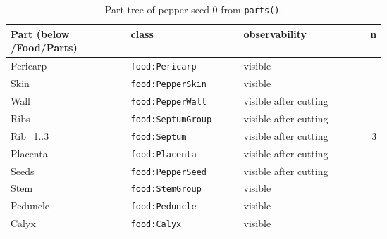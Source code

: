 \documentclass[10.5pt,a4paper]{article}
\begin{document}
\begin{table}[htbp]\centering\scriptsize\caption{Part tree of pepper seed 0 from \texttt{parts()}.}
\begin{tabularx}{\linewidth}{@{}p{0.32\linewidth}p{0.3\linewidth}Xr@{}}\toprule Part (below /Food/Parts) & class & observability & n \\\midrule
\hspace*{0.0em}Pericarp & \texttt{food:Pericarp} & visible &  \\
\hspace*{0.9em}Skin & \texttt{food:PepperSkin} & visible &  \\
\hspace*{0.9em}Wall & \texttt{food:PepperWall} & visible after cutting &  \\
\hspace*{0.0em}Ribs & \texttt{food:SeptumGroup} & visible after cutting &  \\
\hspace*{0.9em}Rib\_1..3 & \texttt{food:Septum} & visible after cutting & 3 \\
\hspace*{0.0em}Placenta & \texttt{food:Placenta} & visible after cutting &  \\
\hspace*{0.0em}Seeds & \texttt{food:PepperSeed} & visible after cutting &  \\
\hspace*{0.0em}Stem & \texttt{food:StemGroup} & visible &  \\
\hspace*{0.9em}Peduncle & \texttt{food:Peduncle} & visible &  \\
\hspace*{0.9em}Calyx & \texttt{food:Calyx} & visible &  \\\bottomrule\end{tabularx}\end{table}
\end{document}
